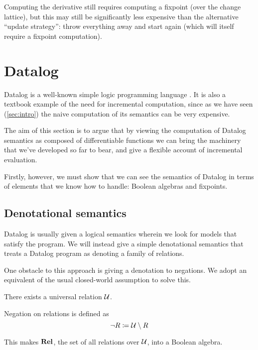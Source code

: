 Computing the derivative still requires computing a fixpoint (over the change
lattice), but this may still be significantly less expensive than the
alternative ``update strategy'': throw everything away and start
again (which will itself require a fixpoint computation).

\section{Datalog}
\label{sec:datalog}

Datalog is a well-known simple logic programming language \autocite[See][part D]{abiteboul1995foundations}.
It is also a textbook example of the need for incremental computation, since as we have seen
(\cref{sec:intro}) the naive computation of its semantics can be very expensive.

The aim of this section is to argue that by viewing the computation
of Datalog semantics as composed of differentiable functions we can
bring the machinery that we've developed so far to bear, and give a flexible
account of incremental evaluation. 

Firstly, however, we must show that we can see the semantics of Datalog in terms
of elements that we know how to handle: Boolean algebras and fixpoints.

\subsection{Denotational semantics}

Datalog is usually given a logical semantics wherein we look for models that
satisfy the program. We will instead give a simple denotational semantics that treats a Datalog
program as denoting a family of relations.

One obstacle to this approach is giving a denotation to negations. We adopt an
equivalent of the usual closed-world assumption to solve this.

\begin{defn}
  There exists a universal relation $\mathcal{U}$.

  Negation on relations is defined as
  \begin{displaymath}
    \neg R \coloneqq \mathcal{U} \setminus R
  \end{displaymath}
\end{defn}

This makes $\mathbf{Rel}$, the set of all relations over $\mathcal{U}$, into a Boolean algebra.

